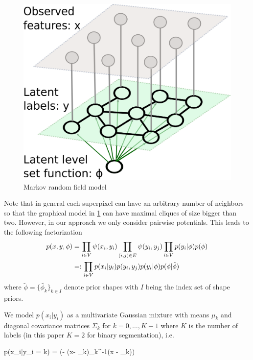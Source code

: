 \documentclass{article} %
\begin{document}
\begin{figure}[t]
  \centering
  \includegraphics[scale = 0.3]{MRF.pdf}
\caption{Markov random field model}
 \label{figure:MRF}
  \end{figure}

Note that in general each superpixel can have an arbitrary number of neighbors so that the graphical model in \ref{figure:MRF} can have maximal cliques of size bigger than two. However, in our approach we only consider pairwise potentials. This leads to the following factorization
\begin{align}
p(x,y,\phi) &=  \prod_{i\in V} \psi(x_i,y_i)  \prod_{(i,j)\in E} \psi(y_i,y_j)\prod_{i\in V} p(y_i|\phi)p(\phi) \label{total_joint}\\
&=: \prod_{i\in V} p(x_i|y_i)p(y_i,y_j)p(y_i|\phi)p(\phi|\tilde{\phi})\nonumber
\end{align}
where  $\tilde{\phi} = \{\tilde{\phi_k}\}_{k\in I}$ denote prior shapes with $I$ being the index set of shape priors.

We model $p(x_i|y_i)$ as a multivariate Gaussian mixture with means $\mu_k$ and diagonal covariance matrices $\Sigma_k$ for $k= 0,\dots,K-1$ where $K$ is the number of labels (in this paper $K=2$ for binary segmentation), i.e. 

\beqs
p(x_i|y_i = k) =  \exp(- (x- \mu_k)\Sigma_k^{-1}(x - \mu_k))
\eeqs
\end{document}

